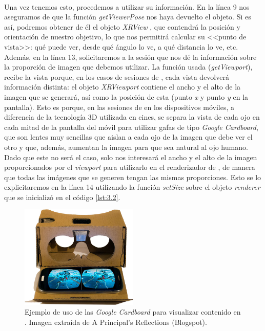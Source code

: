 \documentclass{subfiles}
\begin{document}
        \paragraph{}
        Una vez tenemos esto, procedemos a utilizar su información. En la línea 9 nos aseguramos de que la función \textit{getViewerPose} nos haya devuelto el objeto. Si es así, podremos obtener de él el objeto \textit{XRView} \cite{web:mozilla_xrview}, que contendrá la posición y orientación de nuestro objetivo, lo que nos permitirá calcular su <<punto de vista>>: qué puede ver, desde qué ángulo lo ve, a qué distancia lo ve, etc. Además, en la línea 13, solicitaremos a la sesión que nos dé la información sobre la proporción de imagen que debemos utilizar. La función usada (\textit{getViewport}), recibe la vista porque, en los casos de sesiones de \rv, cada vista devolverá información distinta: el objeto \textit{XRViewport} contiene el ancho y el alto de la imagen que se generará, así como la posición de esta (punto \textit{x} y punto \textit{y} en la pantalla). Esto es porque, en las sesiones de \ra en los dispositivos móviles, a diferencia de la tecnología 3D utilizada en cines, se separa la vista de cada ojo en cada mitad de la pantalla del móvil para utilizar gafas de tipo \textit{Google Cardboard}, que son lentes muy sencillas que aislan a cada ojo de la imagen que debe ver el otro y que, además, aumentan la imagen para que sea natural al ojo humano. Dado que este no será el caso, solo nos interesará el ancho y el alto de la imagen proporcionados por el \textit{viewport} para utilizarlo en el renderizador de \threejs, de manera que todas las imágenes que se generen tengan las mismas proporciones. Esto se lo explicitaremos en la línea 14 utilizando la función \textit{setSize} sobre el objeto \textit{renderer} que se inicializó en el código \ref{lst:3.2}.

\begin{figure}
\centering
\includegraphics[width=0.5\textwidth]{img/google_cardboard.jpg}
\caption{Ejemplo de uso de las \textit{Google Cardboard} para visualizar contenido en \rv. Imagen extraída de A Principal's Reflections (Blogspot).}
\label{fig:google_cardboard}
\end{figure}
\end{document}
